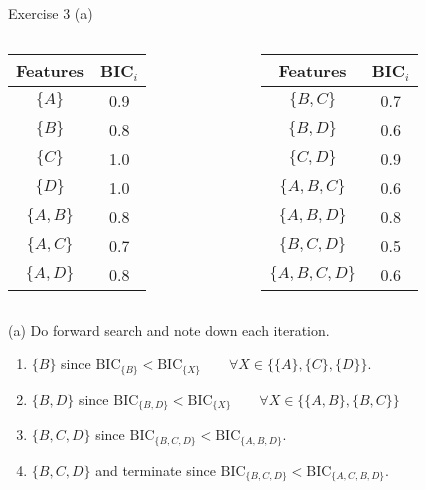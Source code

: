 \documentclass[aspectratio=169]{beamer}
\newcommand{\BIC}[1]{\mathrm{BIC}_{\{#1\}}}
\begin{document}
\begin{frame}{Exercise 3 (a)}
	\begin{columns}
		\begin{column}{0.3\textwidth}
			\centering
			\begin{table}
				\centering
				\begin{tabular}{c c}
					Features & BIC$_i$ \\
					\hline
					$\{A\}$ & 0.9 \\
					$\{B\}$ & 0.8 \\
					$\{C\}$ & 1.0 \\
					$\{D\}$ & 1.0 \\
					$\{A, B\}$ & 0.8 \\
					$\{A, C\}$ & 0.7 \\
					$\{A, D\}$ & 0.8 \\
				\end{tabular}
			\end{table}
		\end{column}
		\begin{column}{0.3 \textwidth}
			\centering
			\begin{table}
				\centering
				\begin{tabular}{c c}
					Features & BIC$_i$ \\
					\hline					
					$\{B, C\}$ & 0.7 \\
					$\{B, D\}$ & 0.6 \\
					$\{C, D\}$ & 0.9 \\
					$\{A, B, C\}$ & 0.6 \\
					$\{A, B, D\}$ & 0.8 \\
					$\{B, C, D\}$ & 0.5 \\
					$\{A, B, C, D\}$ & 0.6 \\
				\end{tabular}
			\end{table}	
		\end{column}
		\hfill
	\end{columns}
	(a) Do forward search and note down each iteration.
	\begin{enumerate}
		\item<2-> $\{B\}$ since $\BIC{B} < \BIC{X} \qquad \forall X \in \{\{A\}, \{C\}, \{D\} \}$.
		\item<3-> $\{B, D \}$ since $\BIC{B, D} < \BIC{X} \qquad \forall X \in \{\{A, B\}, \{B, C\}\}$
		\item<4-> $\{B, C, D \}$ since $\BIC{B, C, D} < \BIC{A, B, D}$.
		\item<5-> $\{B, C, D \}$ and terminate since $\BIC{B, C, D} < \BIC{A, C, B, D}$.
	\end{enumerate}
\end{frame}
\end{document}
